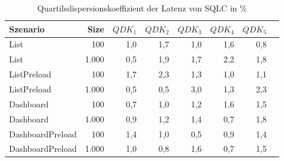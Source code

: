 
\begin{table}[ht]
\setlength{\extrarowheight}{-1pt}
\centering
\caption{Quartilsdispersionskoeffizient der Latenz von SQLC in \%}
\begin{tabular}{lrrrrrrr}
\toprule
Szenario & Size & ${QDK_1}$ & ${QDK_2}$ & ${QDK_3}$& ${QDK_4}$ & ${QDK_5}$ \\
\midrule
	List & 100 & \cellcolor{red!1}  1,0 & \cellcolor{red!2}  1,7 & \cellcolor{red!2}  1,0 & \cellcolor{red!2}  1,6 & \cellcolor{red!1}  0,8 \\
	List & 1.000 & \cellcolor{red!1}  0,5 & \cellcolor{red!2}  1,9 & \cellcolor{red!2}  1,7 & \cellcolor{red!3}  2,2 & \cellcolor{red!2}  1,8 \\
	ListPreload & 100 & \cellcolor{red!2}  1,7 & \cellcolor{red!3}  2,3 & \cellcolor{red!2}  1,3 & \cellcolor{red!1}  1,0 & \cellcolor{red!2}  1,1 \\
	ListPreload & 1.000 & \cellcolor{red!1}  0,5 & \cellcolor{red!1}  0,5 & \cellcolor{red!3}  3,0 & \cellcolor{red!2}  1,3 & \cellcolor{red!3}  2,3 \\
	Dashboard & 100 & \cellcolor{red!1}  0,7 & \cellcolor{red!1}  1,0 & \cellcolor{red!2}  1,2 & \cellcolor{red!2}  1,6 & \cellcolor{red!2}  1,5 \\
	Dashboard & 1.000 & \cellcolor{red!1}  0,9 & \cellcolor{red!2}  1,2 & \cellcolor{red!2}  1,4 & \cellcolor{red!1}  0,7 & \cellcolor{red!2}  1,8 \\
	DashboardPreload & 100 & \cellcolor{red!2}  1,4 & \cellcolor{red!1}  1,0 & \cellcolor{red!1}  0,5 & \cellcolor{red!1}  0,9 & \cellcolor{red!2}  1,4 \\
	DashboardPreload & 1.000 & \cellcolor{red!1}  1,0 & \cellcolor{red!1}  0,8 & \cellcolor{red!2}  1,6 & \cellcolor{red!1}  0,7 & \cellcolor{red!2}  1,5 \\
\bottomrule
\end{tabular}
\label{tab:quartilsdispersionskoeffizient_latenz_sqlc}
\end{table}
	